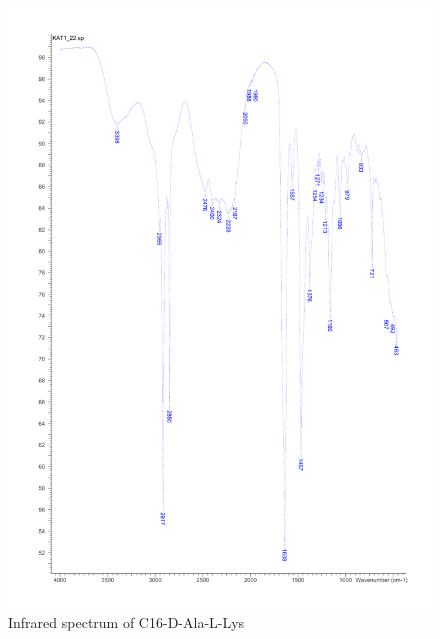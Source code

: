 \begin{figure}[ht!]
\centering
\includegraphics[scale=0.6]{IR/KAT1_22.pdf}
\caption{Infrared spectrum of C16-D-Ala-L-Lys}
\end{figure}

